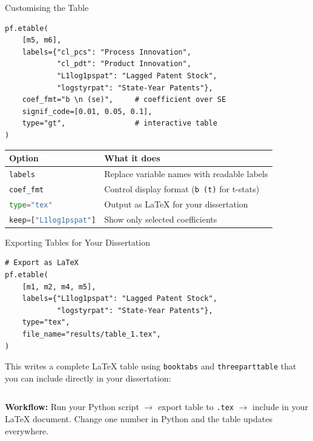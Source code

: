 \documentclass[9pt,aspectratio=169]{beamer}
\newcommand{\py}[1]{\lstinline[language=Python]{#1}}
\begin{document}
\begin{frame}[fragile]{Customising the Table}

\begin{lstlisting}[basicstyle=\ttfamily\scriptsize]
pf.etable(
    [m5, m6],
    labels={"cl_pcs": "Process Innovation",
            "cl_pdt": "Product Innovation",
            "L1log1pspat": "Lagged Patent Stock",
            "logstyrpat": "State-Year Patents"},
    coef_fmt="b \n (se)",     # coefficient over SE
    signif_code=[0.01, 0.05, 0.1],
    type="gt",                # interactive table
)
\end{lstlisting}

\medskip

\begin{tabular}{@{}lp{6cm}@{}}
\toprule
\textbf{Option} & \textbf{What it does} \\
\midrule
\py{labels} & Replace variable names with readable labels \\[0.2em]
\py{coef_fmt} & Control display format (\texttt{b (t)} for t-stats) \\[0.2em]
\py{type="tex"} & Output as \LaTeX{} for your dissertation \\[0.2em]
\py{keep=["L1log1pspat"]} & Show only selected coefficients \\
\bottomrule
\end{tabular}

\end{frame}


\begin{frame}[fragile]{Exporting Tables for Your Dissertation}

\begin{lstlisting}
# Export as LaTeX
pf.etable(
    [m1, m2, m4, m5],
    labels={"L1log1pspat": "Lagged Patent Stock",
            "logstyrpat": "State-Year Patents"},
    type="tex",
    file_name="results/table_1.tex",
)
\end{lstlisting}

\medskip

This writes a complete \LaTeX{} table using \texttt{booktabs} and \texttt{threeparttable} that you can include directly in your dissertation:

\begin{lstlisting}[language=TeX, basicstyle=\ttfamily\scriptsize]

\end{lstlisting}

\bigskip

\begin{highlightbox}
\centering
\textbf{Workflow:} Run your Python script $\to$ export table to \texttt{.tex} $\to$ include in your \LaTeX{} document. Change one number in Python and the table updates everywhere.
\end{highlightbox}

\end{frame}
\end{document}
